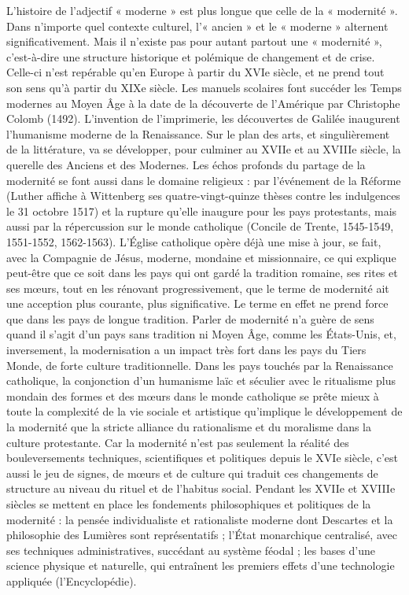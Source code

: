 
L'histoire de l'adjectif « moderne » est plus longue que celle de la « modernité ». Dans n'importe quel contexte culturel, l'« ancien » et le « moderne » alternent significativement. Mais il n'existe pas pour autant partout une « modernité », c'est-à-dire une structure historique et polémique de changement et de crise. Celle-ci n'est repérable qu'en Europe à partir du XVIe siècle, et ne prend tout son sens qu'à partir du XIXe siècle.
Les manuels scolaires font succéder les Temps modernes au Moyen Âge à la date de la découverte de l'Amérique par Christophe Colomb (1492). L'invention de l'imprimerie, les découvertes de Galilée inaugurent l'humanisme moderne de la Renaissance. Sur le plan des arts, et singulièrement de la littérature, va se développer, pour culminer au XVIIe et au XVIIIe siècle, la querelle des Anciens et des Modernes. Les échos profonds du partage de la modernité se font aussi dans le domaine religieux : par l'événement de la Réforme (Luther affiche à Wittenberg ses quatre-vingt-quinze thèses contre les indulgences le 31 octobre 1517) et la rupture qu'elle inaugure pour les pays protestants, mais aussi par la répercussion sur le monde catholique (Concile de Trente, 1545-1549, 1551-1552, 1562-1563). L'Église catholique opère déjà une mise à jour, se fait, avec la Compagnie de Jésus, moderne, mondaine et missionnaire, ce qui explique peut-être que ce soit dans les pays qui ont gardé la tradition romaine, ses rites et ses mœurs, tout en les rénovant progressivement, que le terme de modernité ait une acception plus courante, plus significative. Le terme en effet ne prend force que dans les pays de longue tradition. Parler de modernité n'a guère de sens quand il s'agit d'un pays sans tradition ni Moyen Âge, comme les États-Unis, et, inversement, la modernisation a un impact très fort dans les pays du Tiers Monde, de forte culture traditionnelle.
Dans les pays touchés par la Renaissance catholique, la conjonction d'un humanisme laïc et séculier avec le ritualisme plus mondain des formes et des mœurs dans le monde catholique se prête mieux à toute la complexité de la vie sociale et artistique qu'implique le développement de la modernité que la stricte alliance du rationalisme et du moralisme dans la culture protestante. Car la modernité n'est pas seulement la réalité des bouleversements techniques, scientifiques et politiques depuis le XVIe siècle, c'est aussi le jeu de signes, de mœurs et de culture qui traduit ces changements de structure au niveau du rituel et de l'habitus social.
Pendant les XVIIe et XVIIIe siècles se mettent en place les fondements philosophiques et politiques de la modernité : la pensée individualiste et rationaliste moderne dont Descartes et la philosophie des Lumières sont représentatifs ; l'État monarchique centralisé, avec ses techniques administratives, succédant au système féodal ; les bases d'une science physique et naturelle, qui entraînent les premiers effets d'une technologie appliquée (l'Encyclopédie).
